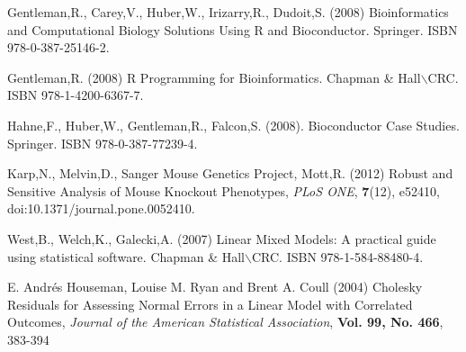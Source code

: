 \documentclass[12pt,a4paper]{article}
\begin{document}
\begin{thebibliography}{}

Gentleman,R., Carey,V., Huber,W., Irizarry,R., Dudoit,S.  (2008) Bioinformatics and Computational Biology Solutions Using R and Bioconductor. Springer.  ISBN 978-0-387-25146-2.

Gentleman,R. (2008) R Programming for Bioinformatics. Chapman \& Hall$\backslash$CRC. ISBN 978-1-4200-6367-7.

Hahne,F., Huber,W., Gentleman,R., Falcon,S. (2008). Bioconductor Case Studies. Springer.  ISBN 978-0-387-77239-4.

 Karp,N., Melvin,D., Sanger Mouse Genetics Project, Mott,R. (2012) Robust and Sensitive Analysis of Mouse Knockout Phenotypes, {\it PLoS ONE}, {\bf 7}(12), e52410, doi:10.1371/journal.pone.0052410.

  West,B., Welch,K., Galecki,A. (2007) Linear Mixed Models: A practical guide using statistical software. Chapman \& Hall$\backslash$CRC. ISBN 978-1-584-88480-4.

 E. Andrés Houseman, Louise M. Ryan and Brent A. Coull (2004) Cholesky Residuals for Assessing Normal Errors in a Linear Model with Correlated Outcomes, {\it Journal of the American Statistical Association}, {\bf Vol. 99, No. 466}, 383-394

\end{thebibliography}
\end{document}
